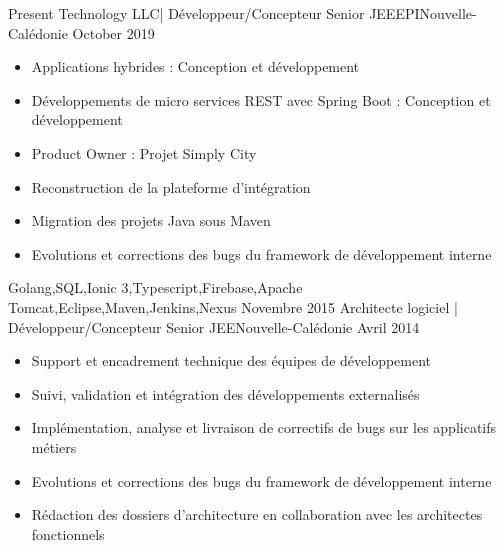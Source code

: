 %
%
%

\begin{experiences}
  \experience
    {Present}   {Technology LLC| Développeur/Concepteur Senior JEE}{EPI}{Nouvelle-Calédonie}
    {October 2019} {
                      \begin{itemize}
                        \item Applications hybrides : Conception et développement
                        \item Développements de micro services REST avec Spring Boot : Conception et développement
                        \item Product Owner : Projet Simply City
                        \item Reconstruction de la plateforme d'intégration
                        \item Migration des projets Java sous Maven
                        \item Evolutions et corrections des bugs du framework de développement interne  
                      \end{itemize}
                    }
                    {Golang,SQL,Ionic 3,Typescript,Firebase,Apache Tomcat,Eclipse,Maven,Jenkins,Nexus}
  \emptySeparator
  \experience
    {Novembre 2015} {Architecte logiciel | Développeur/Concepteur Senior JEE}{}{Nouvelle-Calédonie}
    {Avril 2014}    {
                      \begin{itemize}
                        \item Support et encadrement technique des équipes de développement                           
                        \item Suivi, validation et intégration des développements externalisés                        
                        \item Implémentation, analyse et livraison de correctifs de bugs sur les applicatifs métiers  
                        \item Evolutions et corrections des bugs du framework de développement interne                
                        \item Rédaction des dossiers d'architecture en collaboration avec les architectes fonctionnels

\end{itemize}}
\end{experiences}
